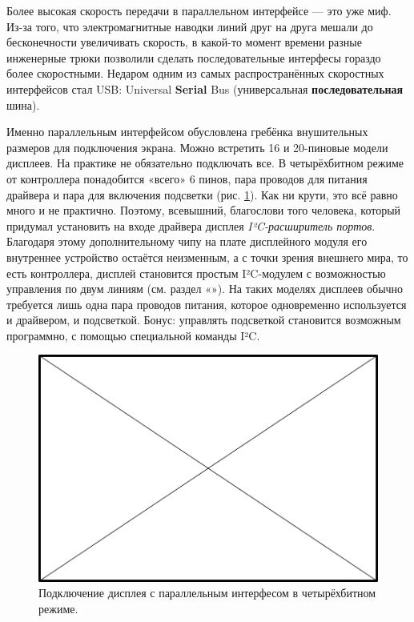 \begin{Note}
  Более высокая скорость передачи в параллельном интерфейсе — это уже миф. Из-за того, что электромагнитные наводки линий друг на друга мешали до бесконечности увеличивать скорость, в какой-то момент времени разные инженерные трюки позволили сделать последовательные интерфесы гораздо более скоростными. Недаром одним из самых распространённых скоростных интерфейсов стал USB: Universal \textbf{Serial} Bus (универсальная \textbf{последовательная} шина).
\end{Note}

Именно параллельным интерфейсом обусловлена гребёнка внушительных размеров для подключения экрана. Можно встретить 16 и 20-пиновые модели дисплеев. На практике не обязательно подключать все. В четырёхбитном режиме от контроллера понадобится «всего» 6 пинов, пара проводов для питания драйвера и пара для включения подсветки (рис. \ref{fig:text-lcd-parallel-4}). Как ни крути, это всё равно много и не практично. Поэтому, всевышний, благослови того человека, который придумал установить на входе драйвера дисплея \emph{I²C-расширитель портов}. Благодаря этому дополнительному чипу на плате дисплейного модуля его внутреннее устройство остаётся неизменным, а с точки зрения внешнего мира, то есть контроллера, дисплей становится простым I²C-модулем с возможностью управления по двум линиям (см. раздел «»). На таких моделях дисплеев обычно требуется лишь одна пара проводов питания, которое одновременно используется и драйвером, и подсветкой. Бонус: управлять подсветкой становится возможным программно, с помощью специальной команды I²C.

\begin{figure}
  \centering
  \includegraphics{TODO}
  \caption{Подключение дисплея с параллельным интерфесом в четырёхбитном режиме.}
  \label{fig:text-lcd-parallel-4}
\end{figure}

